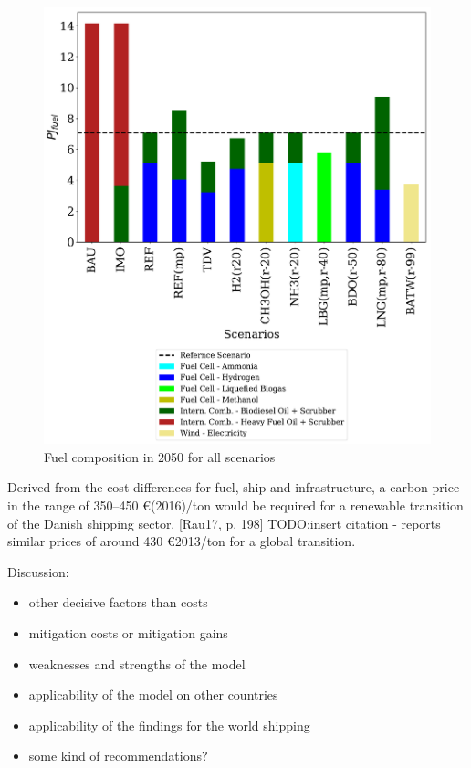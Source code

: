 \documentclass[article]{elsarticle}
\begin{document}
\begin{figure}[htb]
    \centering
    \includegraphics[width=\textwidth]{figures/AllFuel2050.pdf}
    \caption{Fuel composition in 2050 for all scenarios}
    \label{fig:AllFuel2050}
\end{figure}


Derived from the cost differences for fuel, ship and infrastructure, a carbon price in the range of 350--450 \euro(2016)/ton would be required for a renewable transition of the Danish shipping sector. [Rau17, p. 198] TODO:insert citation - reports similar prices of around 430 \euro2013/ton for a global transition.


Discussion:
\begin{itemize}
	\item other decisive factors than costs
	\item mitigation costs or mitigation gains
	\item weaknesses and strengths of the model
	\item applicability of the model on other countries
	\item applicability of the findings for the world shipping
	\item some kind of recommendations?
\end{itemize}
\end{document}
